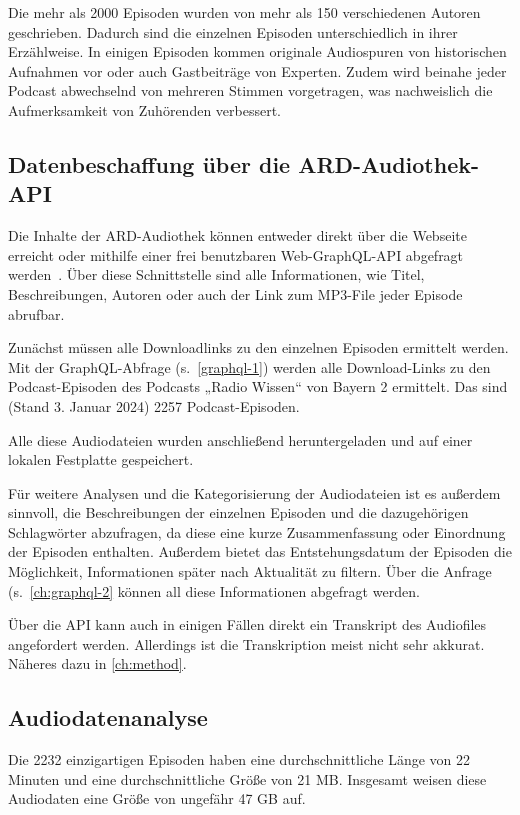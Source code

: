 Die mehr als 2000 Episoden wurden von mehr als 150 verschiedenen Autoren geschrieben.
Dadurch sind die einzelnen Episoden unterschiedlich in ihrer Erzählweise.
In einigen Episoden kommen originale Audiospuren von historischen Aufnahmen vor oder auch Gastbeiträge von Experten.
Zudem wird beinahe jeder Podcast abwechselnd von mehreren Stimmen vorgetragen, was nachweislich die Aufmerksamkeit von Zuhörenden verbessert.

\subsection{Datenbeschaffung über die ARD-Audiothek-API}

Die Inhalte der ARD-Audiothek können entweder direkt über die Webseite erreicht oder mithilfe einer frei benutzbaren Web-GraphQL-API abgefragt werden~\cite{zotero-529}.
Über diese Schnittstelle sind alle Informationen, wie Titel, Beschreibungen, Autoren oder auch der Link zum MP3-File jeder Episode abrufbar.

Zunächst müssen alle Downloadlinks zu den einzelnen Episoden ermittelt werden.
Mit der GraphQL-Abfrage (s.~\autoref{graphql-1}) werden alle Download-Links zu den Podcast-Episoden des Podcasts „Radio Wissen“ von Bayern 2 ermittelt.
Das sind (Stand 3. Januar 2024) 2257 Podcast-Episoden.

Alle diese Audiodateien wurden anschließend heruntergeladen und auf einer lokalen Festplatte gespeichert.

Für weitere Analysen und die Kategorisierung der Audiodateien ist es außerdem sinnvoll, die Beschreibungen der einzelnen Episoden und die dazugehörigen Schlagwörter abzufragen, da diese eine kurze Zusammenfassung oder Einordnung der Episoden enthalten.
Außerdem bietet das Entstehungsdatum der Episoden die Möglichkeit, Informationen später nach Aktualität zu filtern.
Über die Anfrage (s.~\autoref{ch:graphql-2} können all diese Informationen abgefragt werden.

Über die API kann auch in einigen Fällen direkt ein Transkript des Audiofiles angefordert werden.
Allerdings ist die Transkription meist nicht sehr akkurat.
Näheres dazu in \autoref{ch:method}.

\subsection{Audiodatenanalyse}

Die 2232 einzigartigen Episoden haben eine durchschnittliche Länge von 22 Minuten und eine durchschnittliche Größe von 21 MB.
Insgesamt weisen diese Audiodaten eine Größe von ungefähr 47 GB auf.

